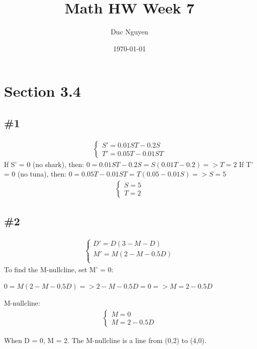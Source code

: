 \documentclass[12pt]{article}
\title{Math HW Week 7}
\author{Duc Nguyen}
\date{\today}
\begin{document}
\maketitle
\section*{Section 3.4}
\subsection*{\#1}
\begin{align*}
    \begin{cases}
    S' = 0.01ST - 0.2S \\
    T' = 0.05T - 0.01ST
    \end{cases}
\end{align*}
If S' = 0 (no shark), then:
$0 = 0.01ST - 0.2S = S(0.01T - 0.2) => T = 2$
If T' = 0 (no tuna), then:
$0 = 0.05T - 0.01ST = T(0.05 - 0.01S) => S = 5$
\begin{align*}
    \begin{cases}
    S = 5 \\
    T = 2
    \end{cases}
\end{align*}
\subsection*{\#2}
\begin{align*}
    \begin{cases}
    D' = D(3 - M -D) \\
    M' = M(2 - M - 0.5D) \\
    \end{cases}
\end{align*}
To find the M-nullcline, set M' = 0:

$0 = M(2 - M - 0.5D) => 2 - M - 0.5D = 0 => M = 2 - 0.5D$

M-nullcline:
\begin{align*}
    \begin{cases}
    M = 0 \\
    M = 2 - 0.5D
    \end{cases}
\end{align*}

When D = 0, M = 2. The M-nullcline is a line from (0,2) to (4,0).
\end{document}
